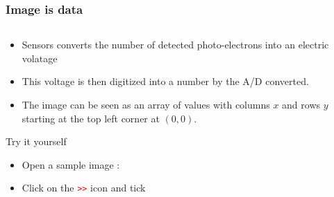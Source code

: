 \documentclass[ignorenonframetext,aspectratio=169,10pt,xcolor=table]{beamer}
\begin{document}
\begin{frame} \frametitle{Image is data}
  \begin{columns}
    \begin{column}{.6\textwidth}
      \begin{itemize}
      \item Sensors converts the number of detected photo-electrons
        into an electric volatage
      \item This voltage is then digitized into a number by the A/D
        converted.
      \item The image can be seen as an array of values with columns
        $x$ and rows $y$ starting at the top left corner at $(0,0)$.
      \end{itemize}
      \begin{block}{Try it yourself}
        \begin{itemize}
        \item Open a sample image : 
        \item Click on the \textcolor{red}{\texttt{>>}} icon and tick
        \end{itemize}
      \end{block}
    \end{column}
    \begin{column}{.4\textwidth} 

\end{column}
\end{columns}
\end{frame}
\end{document}
